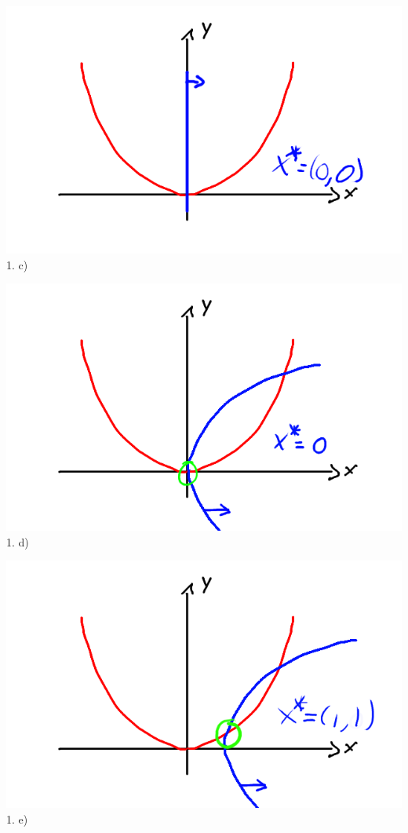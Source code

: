 \begin{minipage}{0.45\textwidth}
\includegraphics[width=\textwidth]{fig/model/1c.png}
1. c)
\end{minipage}
\hfill
\begin{minipage}{0.45\textwidth}
\includegraphics[width=\textwidth]{fig/model/1d.png}
1. d)
\end{minipage}

\begin{minipage}{0.45\textwidth}
\includegraphics[width=\textwidth]{fig/model/1e.png}
1. e)
\end{minipage}

\pagebreak


